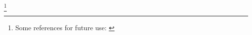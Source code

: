 \documentclass[10pt,titlepage]{book}
\begin{document}
\footnote{Some references for future use:
\cite{arthan1991formal}
\cite{beeson2012foundations}
\cite{centrone2019reflections}
\cite{dzamonja2019}
\cite{gettier1963justified}
\cite{jones1992a,jones1992b}
\cite{kline1990mathematical1}
\cite{kline1990mathematical2}
\cite{kline1990mathematical3}
\cite{kumar2016self}
\cite{kuhn2000structure}
\cite{kuhn2012structure}
\cite{oliveira2006unifying}
\cite{shapiro1991foundations}
\cite{shapiroHPML}
\cite{tarski31}
\cite{tarski56}
}

{}


\end{document}
